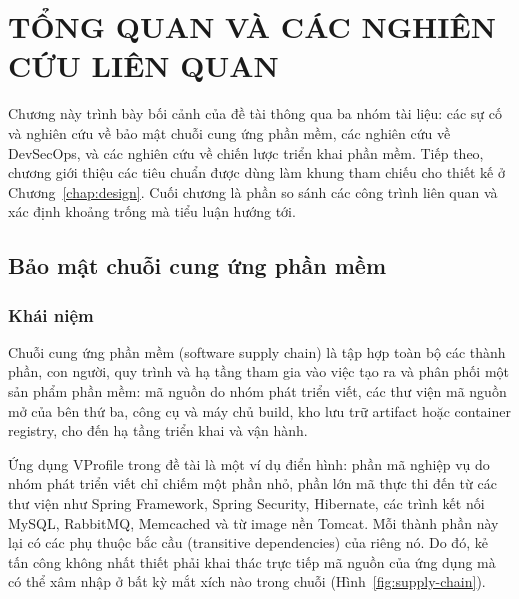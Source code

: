 \documentclass[12pt,a4paper,oneside]{extreport}
\begin{document}
\chapter{TỔNG QUAN VÀ CÁC NGHIÊN CỨU LIÊN QUAN}
\label{chap:related}
Chương này trình bày bối cảnh của đề tài thông qua ba nhóm tài liệu: các sự cố
và nghiên cứu về bảo mật chuỗi cung ứng phần mềm, các nghiên cứu về DevSecOps,
và các nghiên cứu về chiến lược triển khai phần mềm. Tiếp theo, chương giới
thiệu các tiêu chuẩn được dùng làm khung tham chiếu cho thiết kế ở
Chương~\ref{chap:design}. Cuối chương là phần so sánh các công trình liên quan
và xác định khoảng trống mà tiểu luận hướng tới.

\section{Bảo mật chuỗi cung ứng phần mềm}
\label{sec:supply-chain}
\subsection{Khái niệm}
Chuỗi cung ứng phần mềm (software supply chain) là tập hợp toàn bộ các thành
phần, con người, quy trình và hạ tầng tham gia vào việc tạo ra và phân phối một
sản phẩm phần mềm: mã nguồn do nhóm phát triển viết, các thư viện mã nguồn mở
của bên thứ ba, công cụ và máy chủ build, kho lưu trữ artifact hoặc container
registry, cho đến hạ tầng triển khai và vận hành.

Ứng dụng VProfile trong đề tài là một ví dụ điển hình: phần mã nghiệp vụ do nhóm
phát triển viết chỉ chiếm một phần nhỏ, phần lớn mã thực thi đến từ các thư viện
như Spring Framework, Spring Security, Hibernate, các trình kết nối MySQL,
RabbitMQ, Memcached và từ image nền Tomcat. Mỗi thành phần này lại có các phụ
thuộc bắc cầu (transitive dependencies) của riêng nó. Do đó, kẻ tấn công không
nhất thiết phải khai thác trực tiếp mã nguồn của ứng dụng mà có thể xâm nhập ở
bất kỳ mắt xích nào trong chuỗi (Hình~\ref{fig:supply-chain}).
\end{document}
